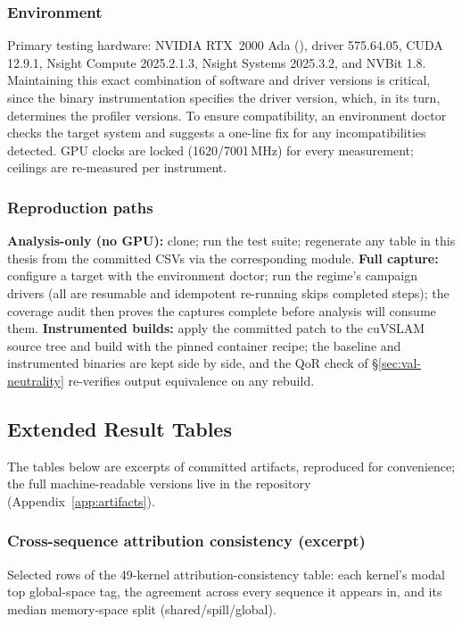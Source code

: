 \subsubsection{Environment}

Primary testing hardware: NVIDIA RTX~2000 Ada (), driver
575.64.05, CUDA 12.9.1, Nsight Compute 2025.2.1.3, Nsight Systems 2025.3.2,
and NVBit 1.8. Maintaining this exact combination of software and driver
versions is critical, since the binary instrumentation specifies the driver
version, which, in its turn, determines the profiler versions. To ensure
compatibility, an environment doctor checks the target system and suggests
a one-line fix for any incompatibilities detected. GPU clocks are locked
(1620/7001\,MHz) for every measurement; ceilings are re-measured per
instrument.

\subsubsection{Reproduction paths}

\textbf{Analysis-only (no GPU):} clone; run the test suite; regenerate any
table in this thesis from the committed CSVs via the corresponding
 module. \textbf{Full capture:} configure a target with the
environment doctor; run the regime's campaign drivers (all are resumable
and idempotent re-running skips completed steps); the coverage audit
then proves the captures complete before analysis will consume them.
\textbf{Instrumented builds:} apply the committed patch to the cuVSLAM
source tree and build with the pinned container recipe; the baseline and
instrumented binaries are kept side by side, and the QoR check of
\S\ref{sec:val-neutrality} re-verifies output equivalence on any rebuild.

\subsection{Extended Result Tables}
\label{app:tables}

The tables below are excerpts of committed artifacts, reproduced for
convenience; the full machine-readable versions live in the repository
(Appendix~\ref{app:artifacts}).

\subsubsection{Cross-sequence attribution consistency (excerpt)}

Selected rows of the 49-kernel attribution-consistency table: each kernel's
modal top global-space tag, the agreement across every sequence it appears
in, and its median memory-space split (shared/spill/global).

